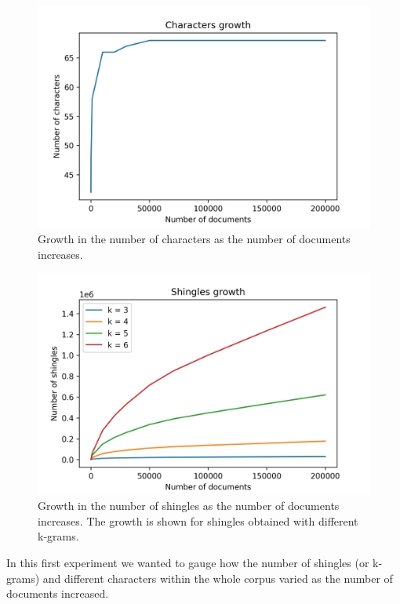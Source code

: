\documentclass[runningheads]{llncs}
\begin{document}
\begin{figure}
  \center
  \includegraphics[width=1\textwidth]{../img/char_growth.png}
  \caption{Growth in the number of characters as the number of documents increases.} 
  \label{fig:experiments:char_growth}
\end{figure}

\begin{figure}
  \center
  \includegraphics[width=1\textwidth]{../img/shingles_growth.png}
  \caption{Growth in the number of shingles as the number of documents increases. The growth is shown for shingles obtained with different k-grams.} 
  \label{fig:experiments:shingles_growth}
\end{figure}

In this first experiment we wanted to gauge how the number of shingles (or k-grams) and different characters within the whole corpus varied as the number of documents increased. 
\end{document}
